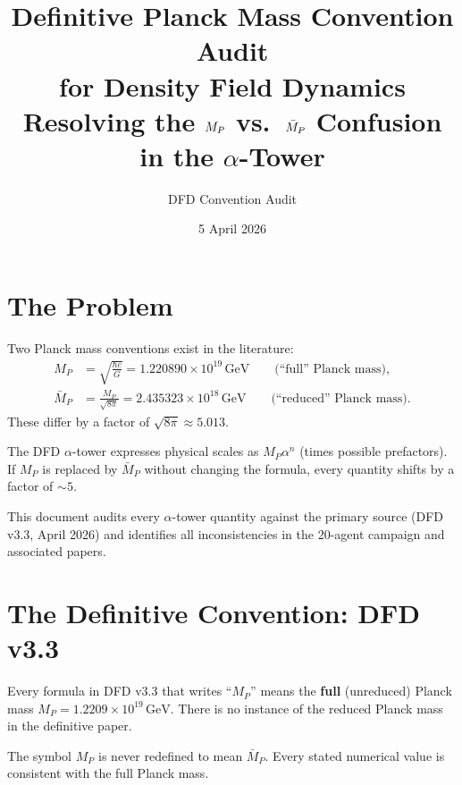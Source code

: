 \documentclass[11pt]{article}
\title{Definitive Planck Mass Convention Audit\\for Density Field Dynamics\\[6pt]
\large Resolving the $\MP$ vs.\ $\MPbar$ Confusion in the $\alpha$-Tower}
\author{DFD Convention Audit}
\date{5 April 2026}
\newcommand{\MP}{M_P}
\newcommand{\MPbar}{\bar{M}_P}
\newcommand{\GeV}{\,\mathrm{GeV}}
\begin{document}
\maketitle

\section{The Problem}

Two Planck mass conventions exist in the literature:
\begin{align}
  \MP &= \sqrt{\frac{\hbar c}{G}} = 1.220890 \times 10^{19}\GeV
  \qquad\text{(``full'' Planck mass)}, \\[4pt]
  \MPbar &= \frac{\MP}{\sqrt{8\pi}} = 2.435323 \times 10^{18}\GeV
  \qquad\text{(``reduced'' Planck mass)}.
\end{align}
These differ by a factor of $\sqrt{8\pi} \approx 5.013$.

The DFD $\alpha$-tower expresses physical scales as $\MP \alpha^n$ (times
possible prefactors). If $\MP$ is replaced by $\MPbar$ without changing the
formula, every quantity shifts by a factor of $\sim 5$.

This document audits every $\alpha$-tower quantity against the primary source
(DFD v3.3, April 2026) and identifies all inconsistencies in the 20-agent
campaign and associated papers.

\section{The Definitive Convention: DFD v3.3}

\begin{tcolorbox}[colback=green!5!white, colframe=green!60!black,
  title=\textbf{Result: DFD v3.3 uses the FULL Planck mass $\MP = \sqrt{\hbar c/G}$ throughout}]
Every formula in DFD v3.3 that writes ``$\MP$'' means the \textbf{full}
(unreduced) Planck mass $\MP = 1.2209 \times 10^{19}\GeV$. There is no
instance of the reduced Planck mass in the definitive paper.

The symbol $\MP$ is never redefined to mean $\MPbar$. Every stated numerical
value is consistent with the full Planck mass.
\end{tcolorbox}
\end{document}
